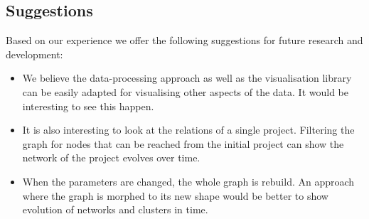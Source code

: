 \documentclass[10pt,a4paper]{article}
\begin{document}
\subsection{Suggestions}

Based on our experience we offer the following suggestions for future research and development:

\begin{itemize}
    \item We believe the data-processing approach as well as the visualisation library can be easily adapted for visualising other aspects of the data. It would be interesting to see this happen.
    \item It is also interesting to look at the relations of a single project. Filtering the graph for nodes that can be reached from the initial project can show the network of the project evolves over time.
    \item When the parameters are changed, the whole graph is rebuild. An approach where the graph is morphed to its new shape would be better to show evolution of networks and clusters in time.
\end{itemize}



\end{document}
